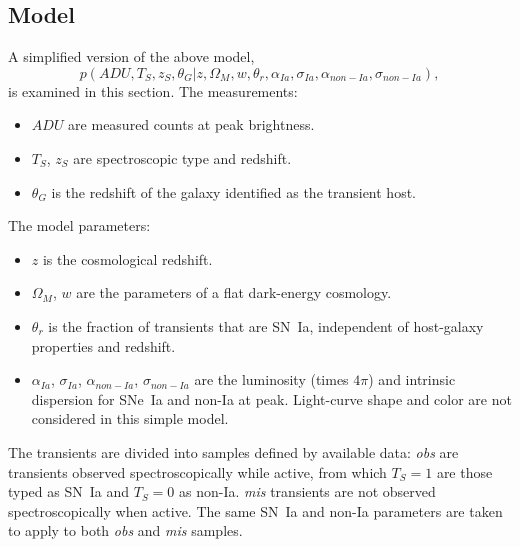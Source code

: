 \documentclass[preprint]{aastex}
\begin{document}
\subsection{Model}
A simplified version of the above model,
\begin{equation}
p(\mathit{ADU}, {{T}}_S,{{z}}_S, \theta_G| z, \Omega_M, w, \theta_r,\alpha_{Ia},\sigma_{Ia}, \alpha_{\mathit{non-Ia}},\sigma_{\mathit{non-Ia}}),
\end{equation}
is examined in this section.
The measurements: 
\begin{itemize}
\item $\mathit{ADU}$ are measured counts at peak brightness.
\item ${{T}}_S$, ${{z}}_S$ are spectroscopic type and redshift.
\item $\theta_G$ is the redshift of the galaxy identified as the transient host.
\end{itemize}
The model parameters:
\begin{itemize}
\item $z$ is the cosmological redshift.
\item $\Omega_M$, $w$ are the parameters of a flat dark-energy cosmology.
\item $\theta_r$ is the fraction of transients that are SN~Ia, independent
of host-galaxy properties and redshift.
\item $\alpha_{Ia}$, $\sigma_{Ia}$, $\alpha_{\mathit{non-Ia}}$, $\sigma_{\mathit{non-Ia}}$ are
the luminosity (times $4\pi$) and intrinsic dispersion for SNe~Ia and non-Ia at peak.
Light-curve shape and color are not considered in this simple model.
\end{itemize}

The transients are divided into samples defined by available data: {\it obs} are transients observed spectroscopically while active, from which $T_S=1$ are those typed
as SN~Ia and $T_S=0$ as non-Ia.  {\it mis} transients are not observed
spectroscopically when active.  The same SN~Ia and non-Ia parameters are taken to
apply to both {\it obs} and {\it mis} samples.
\end{document}

